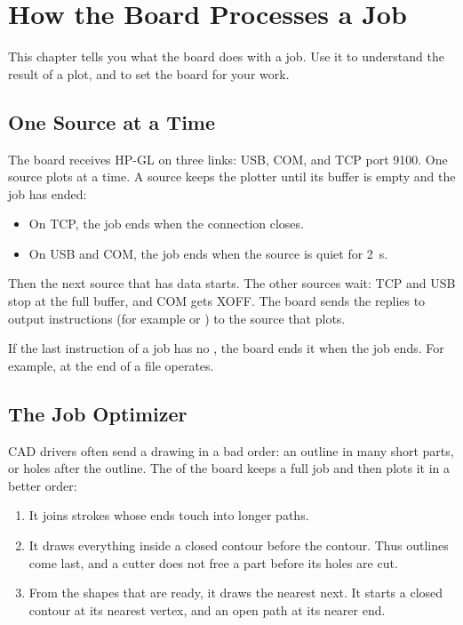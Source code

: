 \chapter{How the Board Processes a Job}\label{ch:jobs}

This chapter tells you what the board does with a job. Use it to understand
the result of a plot, and to set the board for your work.

\section{One Source at a Time}

The board receives HP-GL on three links: USB, COM, and TCP port 9100. One
source plots at a time. A source keeps the plotter until its buffer is empty
and the job has ended:

\begin{itemize}
  \item On TCP, the job ends when the connection closes.
  \item On USB and COM, the job ends when the source is quiet for 2~s.
\end{itemize}

Then the next source that has data starts. The other sources wait: TCP and
USB stop at the full buffer, and COM gets XOFF. The board sends the replies
to output instructions (for example  or ) to the source that
plots.

If the last instruction of a job has no \code{;}, the board ends it when the
job ends. For example,  at the end of a file operates.

\section{The Job Optimizer}\label{sec:optimizer}

CAD drivers often send a drawing in a bad order: an outline in many short
parts, or holes after the outline. The  of the board
keeps a full job and then plots it in a better order:

\begin{enumerate}
  \item It joins strokes whose ends touch into longer paths.
  \item It draws everything inside a closed contour before the contour. Thus
        outlines come last, and a cutter does not free a part before its
        holes are cut.
  \item From the shapes that are ready, it draws the nearest next. It starts
        a closed contour at its nearest vertex, and an open path at its
        nearer end.
\end{enumerate}

